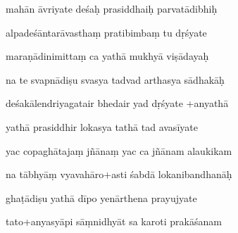 \documentclass[article,12pt,a4paper]{memoir}%
\newcounter{parCount}
\begin{document}
	  
	  \pstart {} mahān āvriyate deśaḥ prasiddhaiḥ parvatādibhiḥ 
	{}
	\pend%
      

	  
	  \pstart \leavevmode%
	alpadeśāntarāvasthaṃ pratibimbaṃ tu dṛśyate 
	{}
	\pend%
      

	  
	  \pstart {} maraṇādinimittaṃ ca yathā mukhyā viṣādayaḥ 
	{}
	\pend%
      

	  
	  \pstart \leavevmode%
	na te svapnādiṣu svasya tadvad arthasya sādhakāḥ 
	{}
	\pend%
      

	  
	  \pstart {} deśakālendriyagatair bhedair yad dṛśyate +anyathā 
	{}
	\pend%
      

	  
	  \pstart \leavevmode%
	yathā prasiddhir lokasya tathā tad avasīyate 
	{}
	\pend%
      

	  
	  \pstart {} yac copaghātajaṃ jñānaṃ yac ca jñānam alaukikam 
	{}
	\pend%
      

	  
	  \pstart \leavevmode%
	na tābhyāṃ vyavahāro+asti śabdā lokanibandhanāḥ 
	{}
	\pend%
      

	  
	  \pstart {} ghaṭādiṣu yathā dīpo yenārthena prayujyate 
	{}
	\pend%
      

	  
	  \pstart \leavevmode%
	tato+anyasyāpi sāṃnidhyāt sa karoti prakāśanam 
	{}
	\pend%
      
\end{document}
